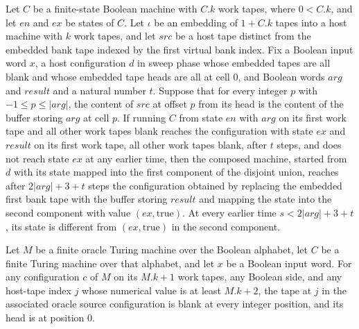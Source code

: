 \begin{theorem}
\label{Turing.oracleService_run}
\leanok
{}
Let $C$ be a finite-state Boolean machine with $C.k$ work tapes, where $0<C.k$, and let
$en$ and $ex$ be states of $C$. Let $\iota$ be an embedding of $1+C.k$ tapes into a host
machine with $k$ work tapes, and let $src$ be a host tape distinct from the embedded
bank tape indexed by the first virtual bank index. Fix a Boolean input word $x$, a host
configuration $d$ in sweep phase whose embedded tapes are all blank and whose embedded
tape heads are all at cell $0$, and Boolean words $arg$ and $result$ and a natural
number $t$. Suppose that for every integer $p$ with $-1\le p\le |arg|$, the content of
$src$ at offset $p$ from its head is the content of the buffer storing $arg$ at cell
$p$. If running $C$ from state $en$ with $arg$ on its first work tape and all other work
tapes blank reaches the configuration with state $ex$ and $result$ on its first work
tape, all other work tapes blank, after $t$ steps, and does not reach state $ex$ at any
earlier time, then the composed machine, started from $d$ with its state mapped into the
first component of the disjoint union, reaches after $2|arg|+3+t$ steps the
configuration obtained by replacing the embedded first bank tape with the buffer storing
$result$ and mapping the state into the second component with value
$(ex,\mathrm{true})$. At every earlier time $s<2|arg|+3+t$, its state is different from
$(ex,\mathrm{true})$ in the second component.
\end{theorem}

\begin{theorem}
\label{Turing.oracleSourceCfg_frame}
\leanok
{}
Let $M$ be a finite oracle Turing machine over the Boolean alphabet, let $C$ be a finite
Turing machine over that alphabet, and let $x$ be a Boolean input word. For any
configuration $c$ of $M$ on its $M.k+1$ work tapes, any Boolean side, and any host-tape
index $j$ whose numerical value is at least $M.k+2$, the tape at $j$ in the associated
oracle source configuration is blank at every integer position, and its head is at
position $0$.
\end{theorem}

